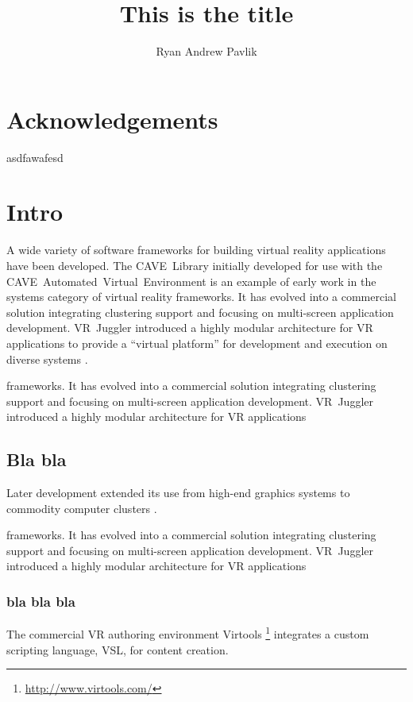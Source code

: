 \documentclass[draftcls]{rpisudiss}
\title{This is the title}
\author{Ryan Andrew Pavlik}
\begin{document}
\thispagestyle{empty}
\maketitle

\tableofcontents{}
\listoffigures
\listoftables

\chapter{Acknowledgements}
asdfawafesd


\mainmatter

\chapter{Intro}


A wide variety of software frameworks for building virtual reality
applications have been developed. The CAVE~Library initially developed
for use with the CAVE~Automated~Virtual~Environment \cite{Cruz-Neira1993}
is an example of early work in the systems category of virtual reality
frameworks. It has evolved into a commercial solution integrating
clustering support and focusing on multi-screen application development.
VR~Juggler introduced a highly modular architecture for VR applications
to provide a ``virtual platform'' for development and execution
on diverse systems \cite{Bierbaum2001,Bierbaum2005}.

frameworks. It has evolved into a commercial solution integrating
clustering support and focusing on multi-screen application development.
VR~Juggler introduced a highly modular architecture for VR applications

\section{Bla bla}
Later development
extended its use from high-end graphics systems to commodity computer
clusters \cite{Allard2002,Bierbaum2005}.


frameworks. It has evolved into a commercial solution integrating
clustering support and focusing on multi-screen application development.
VR~Juggler introduced a highly modular architecture for VR applications

\subsection{bla bla bla}
The commercial
VR authoring environment Virtools%
\footnote{\url{http://www.virtools.com/}%
} integrates a custom scripting language, VSL, for content creation.
\end{document}
